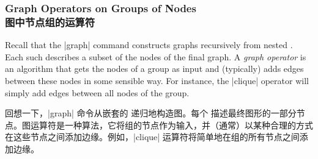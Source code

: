 \subsubsection{Graph Operators on Groups of Nodes\\图中节点组的运算符}

Recall that the |graph| command constructs graphs recursively from nested
. Each such  describes a
subset of the nodes of the final graph. A \emph{graph operator} is an algorithm
that gets the nodes of a group as input and (typically) adds edges between
these nodes in some sensible way. For instance, the |clique| operator will
simply add edges between all nodes of the group.

回想一下，|graph| 命令从嵌套的  递归地构造图。每个  描述最终图形的一部分节点。图运算符是一种算法，它将组的节点作为输入，并（通常）以某种合理的方式在这些节点之间添加边缘。例如，|clique| 运算符将简单地在组的所有节点之间添加边缘。

